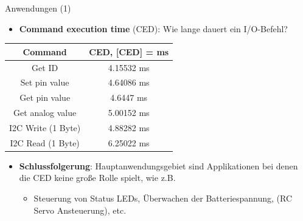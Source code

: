 \documentclass{beamer}
\begin{document}
\begin{frame}{Anwendungen (1)}
\begin{itemize}
 \item \textbf{Command execution time} (CED): Wie lange dauert ein I/O-Befehl?
\end{itemize}
\begin{table}[htbp]
 \begin{tabular}{|c|c|}
 \hline 
 \textbf{Command} & \textbf{CED, [CED] = ms} \\ 
 \hline \hline 
 Get ID & 4.15532 ms \\ 
 \hline 
 Set pin value & 4.64086 ms  \\ 
 \hline
 Get pin value & 4.6447 ms \\ 
 \hline
 Get analog value & 5.00152 ms \\ 
 \hline
 I2C Write (1 Byte)  & 4.88282 ms\\ 
 \hline
 I2C Read (1 Byte) & 6.25022 ms \\
 \hline
 \end{tabular}
\end{table}
\begin{itemize}
 \item \textbf{Schlussfolgerung}: Hauptanwendungsgebiet sind Applikationen bei denen die CED keine gro\ss{}e Rolle spielt, wie z.B.
 \begin{itemize}
  \item Steuerung von Status LEDs, \"Uberwachen der Batteriespannung, (RC Servo Ansteuerung), etc.
 \end{itemize}
\end{itemize}
\end{frame}
\end{document}
